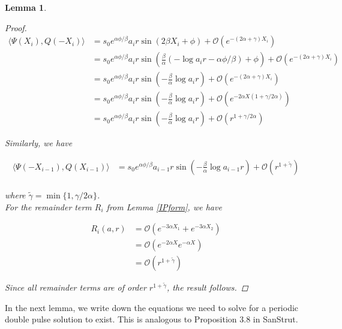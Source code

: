 \documentclass[12pt]{article}
\newtheorem{lemma}{Lemma}
\begin{document}
\begin{lemma}
\begin{proof}
\begin{align*}
\langle \Psi(X_i), Q(-X_i) \rangle 
&= s_0 e^{\alpha \phi / \beta } a_i r \sin \left( 2 \beta X_i  + \phi \right) + \mathcal{O}(e^{-(2 \alpha + \gamma) X_i}) \\
&= s_0 e^{\alpha \phi / \beta } a_i r \sin \left( \frac{\beta}{\alpha} ( -\log a_i r - \alpha \phi / \beta ) + \phi \right) + \mathcal{O}(e^{-(2 \alpha + \gamma) X_i}) \\
&= s_0 e^{\alpha \phi / \beta } a_i r \sin \left( - \frac{\beta}{\alpha} \log a_i r \right) + \mathcal{O}(e^{-(2 \alpha + \gamma) X_i}) \\
&= s_0 e^{\alpha \phi / \beta } a_i r \sin \left( - \frac{\beta}{\alpha} \log a_i r \right) + \mathcal{O}(e^{-2 \alpha X (1 + \gamma / 2 \alpha)}) \\
&= s_0 e^{\alpha \phi / \beta } a_i r \sin \left( - \frac{\beta}{\alpha} \log a_i r \right) + \mathcal{O}(r^{1 + \gamma / 2 \alpha})
\end{align*}

Similarly, we have

\begin{align*}
\langle \Psi(-X_{i-1}), Q(X_{i-1}) \rangle 
&= s_0 e^{\alpha \phi / \beta } a_{i-1} r \sin \left( - \frac{\beta}{\alpha} \log a_{i-1} r \right) + \mathcal{O}(r^{1 + \tilde{\gamma}}) \\
\end{align*}

where $\tilde{\gamma} = \min\{ 1, \gamma / 2 \alpha \}$. \\

For the remainder term $R_i$ from Lemma \ref{IPform}, we have

\begin{align*}
R_i(a, r) &= \mathcal{O}( e^{-3 \alpha X_1} +  e^{-3 \alpha X_2} ) \\
&= \mathcal{O}( e^{-2 \alpha X} e^{-\alpha X} ) \\
&= \mathcal{O}(r^{1 + \tilde{\gamma}}) 
\end{align*}

Since all remainder terms are of order $r^{1 + \tilde{\gamma}}$, the result follows. 

\end{proof}
\end{lemma}

In the next lemma, we write down the equations we need to solve for a periodic double pulse solution to exist. This is analogous to Proposition 3.8 in SanStrut.
\end{document}
